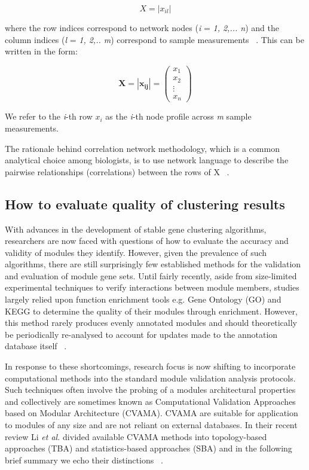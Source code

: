 \begin{equation}
X = |x_ {il}|
\end{equation}

where the row indices correspond to network nodes (\textit{i} = \textit{1, 2,... n}) and the column indices (\textit{l} = \textit{1, 2,.. m}) correspond to sample measurements ~\autocite{Lan2008}. This can be written in the form:

\begin{equation}
\mathbf{X = |x_ {ij}|} = \left(
\begin{array}{c}
x_\textit{1} \\
x_\textit{2} \\
\vdots \\
x_\textit{n}
\end{array} \right)
\end{equation}

We refer to the \textit{i}-th row $x_i$ as the \textit{i}-th node profile across \textit{m} sample measurements. 

The rationale behind correlation network methodology, which is a common analytical choice among biologists, is to use network language to describe the pairwise relationships (correlations) between the rows of X ~\autocite{Lan2008}.

\subsection{How to evaluate quality of clustering results}

With advances in the development of stable gene clustering algorithms, researchers are now faced with questions of how to evaluate the accuracy and validity of modules they identify. However, given the prevalence of such algorithms, there are still surprisingly few established methods for the validation and evaluation of module gene sets. Until fairly recently, aside from size-limited experimental techniques to verify interactions between module members, studies largely relied upon function enrichment tools e.g. Gene Ontology (GO) and KEGG to determine the quality of their modules through enrichment. However, this method rarely produces evenly annotated modules and should theoretically be periodically re-analysed to account for updates made to the annotation database itself ~\autocite{Li2015}. 

In response to these shortcomings, research focus is now shifting to incorporate computational methods into the standard module validation analysis protocols. Such techniques often involve the probing of a modules architectural properties and collectively are sometimes known as Computational Validation Approaches based on Modular Architecture (CVAMA). CVAMA are suitable for application to modules of any size and are not reliant on external databases. In their recent review Li \textit{et al.} divided available CVAMA methods into topology-based approaches (TBA) and statistics-based approaches (SBA) and in the following brief summary we echo their distinctions ~\autocite{Li2015}. 

